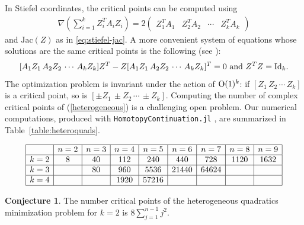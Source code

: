 \documentclass[12pt]{extarticle}
\theoremstyle{definition}
\newtheorem{conjecture}[theorem]{Conjecture}
\numberwithin{theorem}{section}
\begin{document}
In Stiefel coordinates, the critical points
can be computed using
\begin{align*}
    \nabla \left( \sum_{i=1}^k Z_i^T A_i Z_i \right)= 2\begin{pmatrix} Z_1^TA_1 & Z_2^TA_2 & \cdots & Z_k^TA_k \end{pmatrix}
  \end{align*}
and $\mathrm{Jac}(Z)$ as in \eqref{eq:stiefel-jac}. A more convenient system of equations whose solutions are the same critical points is the following (see \cite[Lemma 1]{oviedo2022}):
$$ [A_1Z_1 \, A_2Z_2 \, \cdots \, A_kZ_k]Z^T - Z[A_1Z_1 \, A_2Z_2 \, \cdots \, A_kZ_k]^T = 0 \mbox{   and    } 
Z^TZ = {\rm Id}_k.$$ 
The optimization problem is invariant under the action of ${\rm O}(1)^k$: if $[Z_1 \, Z_2 \, \cdots \, Z_k]$ is a critical point, so is $[\pm Z_1 \, \pm Z_2 \, \cdots \, \pm Z_k]$. Computing the number of complex critical points of (\ref{heterogeneous}) is a challenging open problem. 
Our numerical computations, produced with \verb+HomotopyContinuation.jl+ \cite{hc}, are summarized in Table~\ref{table:heteroquads}. 
\begin{table}[h] 
    \[
    \begin{array}{|c|c|c|c|c|c|c|c|c|}
    \hline
        & n = 2 &  n = 3 & n = 4 & n=5 & n = 6 & n = 7 & n = 8 & n = 9\\
              \hline
        k = 2 & 8 & 40 & 112 & 240 & 440 & 728 & 1120 & 1632\\
        \hline
        k = 3 & &  80 & 960 & 5536 & 21440 & 64624 & &\\
        \hline
        k = 4 &  &  & 1920 & 57216 & & & & \\
        \hline
    \end{array}\]
    \caption{Degrees of the heterogeneous quadratics minimization problem for small $k, n$.}\label{table:heteroquads}
\end{table}
\begin{conjecture}
The number critical points of the heterogeneous quadratics minimization problem for $k=2$ is $8  \sum_{j=1}^{n-1} j^2.$
\end{conjecture}
\end{document}
